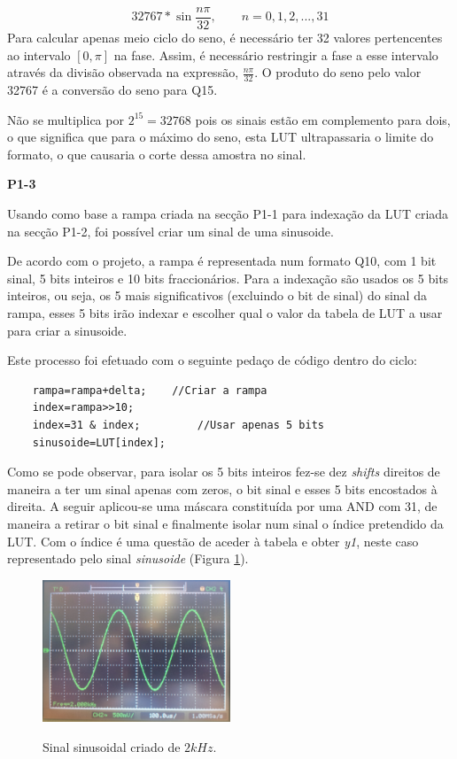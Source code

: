 \documentclass[11pt]{article}
\begin{document}
\begin{equation}
32767*\sin \dfrac{n \pi}{32},  \quad \quad n=0,1,2,...,31
\end{equation}
Para calcular apenas meio ciclo do seno, é necessário ter 32 valores pertencentes ao intervalo $[0,\pi]$ na fase. Assim, é necessário restringir a fase a esse intervalo através da divisão observada na expressão, $\frac{n \pi}{32}$. O produto do seno pelo valor 32767 é a conversão do seno para Q15. 

Não se multiplica por $2 ^{15}=32768$ pois os sinais estão em complemento para dois, o que significa que para o máximo do seno, esta LUT ultrapassaria o limite do formato, o que causaria o corte dessa amostra no sinal.
\vspace{2 mm}

\textbf{P1-3}
\label{para:P1-3}

Usando como base a rampa criada na secção P1-1 para indexação da LUT criada na secção P1-2, foi possível criar um sinal de uma sinusoide.

De acordo com o projeto, a rampa é representada num formato Q10, com 1 bit sinal, 5 bits inteiros e 10 bits fraccionários. 
Para a indexação são usados os 5 bits inteiros, ou seja, os 5 mais significativos (excluindo o bit de sinal) do sinal da rampa, esses 5 bits irão indexar e escolher qual o valor da tabela de LUT a usar para criar a sinusoide. 

Este processo foi efetuado com o seguinte pedaço de código dentro do ciclo:

\begin{lstlisting}
	rampa=rampa+delta;    //Criar a rampa
	index=rampa>>10;
	index=31 & index;         //Usar apenas 5 bits
	sinusoide=LUT[index];
\end{lstlisting}

Como se pode observar, para isolar os 5 bits inteiros fez-se dez \textit{shifts} direitos de maneira a ter um sinal apenas com zeros, o bit sinal e esses 5 bits encostados à direita. A seguir aplicou-se uma máscara constituída por uma AND com 31, de maneira a retirar o bit sinal e finalmente isolar num sinal o índice pretendido da LUT. Com o índice é uma questão de aceder à tabela e obter \textit{y1}, neste caso representado pelo sinal \textit{sinusoide} (Figura \ref{fig:sen2k}).

\begin{figure}[H]
	\centering
	\includegraphics[width=0.5\textwidth]{./P1_1seno}~\\
	\caption{Sinal sinusoidal criado de $ 2 kHz $.}
	\label{fig:sen2k}
\end{figure}
\end{document}
